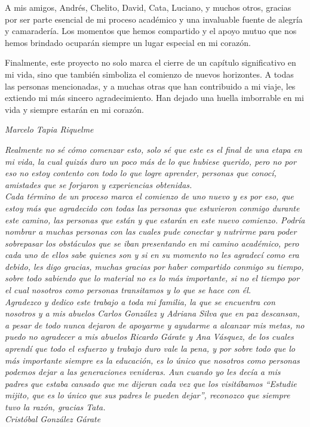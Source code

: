 A mis amigos, Andrés, Chelito, David, Cata, Luciano, y muchos otros, gracias por ser parte esencial de mi proceso académico y una invaluable fuente de alegría y camaradería. Los momentos que hemos compartido y el apoyo mutuo que nos hemos brindado ocuparán siempre un lugar especial en mi corazón.

Finalmente, este proyecto no solo marca el cierre de un capítulo significativo en mi vida, sino que también simboliza el comienzo de nuevos horizontes. A todas las personas mencionadas, y a muchas otras que han contribuido a mi viaje, les extiendo mi más sincero agradecimiento. Han dejado una huella imborrable en mi vida y siempre estarán en mi corazón.

\textit{Marcelo Tapia Riquelme}

\vspace{2cm}

\begin{flushright}
    \textit{Realmente no sé cómo comenzar esto, solo sé que este es el final de una etapa en mi vida, la cual quizás duro un poco más de lo que hubiese querido, pero no por eso no estoy contento con todo lo que logre aprender, personas que conocí, amistades que se forjaron y experiencias obtenidas. \\
    Cada término de un proceso marca el comienzo de uno nuevo y es por eso, que estoy más que agradecido con todas las personas que estuvieron conmigo durante este camino, las personas que están y que estarán en este nuevo comienzo. Podría nombrar a muchas personas con las cuales pude conectar y nutrirme para poder sobrepasar los obstáculos que se iban presentando en mi camino académico, pero cada uno de ellos sabe quienes son y si en su momento no les agradecí como era debido, les digo gracias, muchas gracias por haber compartido conmigo su tiempo, sobre todo sabiendo que lo material no es lo más importante, si no el tiempo por el cual nosotros como personas transitamos y lo que se hace con él. \\
    Agradezco y dedico este trabajo a toda mi familia, la que se encuentra con nosotros y a mis abuelos Carlos González y Adriana Silva que en paz descansan, a pesar de todo nunca dejaron de apoyarme y ayudarme a alcanzar mis metas, no puedo no agradecer a mis abuelos Ricardo Gárate y Ana Vásquez, de los cuales aprendí que todo el esfuerzo y trabajo duro vale la pena, y por sobre todo que lo más importante siempre es la educación, es lo único que nosotros como personas podemos dejar a las generaciones venideras. Aun cuando yo les decía a mis padres que estaba cansado que me dijeran cada vez que los visitábamos “Estudie mijito, que es lo único que sus padres le pueden dejar”, reconozco que siempre tuvo la razón, gracias Tata. \\}
    \textit{Cristóbal González Gárate}
\end{flushright}